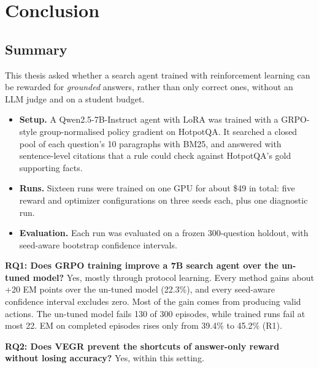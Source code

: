 \chapter{Conclusion}\label{sec:5}

\section{Summary}\label{sec:5.1}

This thesis asked whether a search agent trained with reinforcement
learning can be rewarded for \emph{grounded} answers, rather than only
correct ones, without an LLM judge and on a student budget.

\begin{itemize}
\tightlist
\item
  \textbf{Setup.} A Qwen2.5-7B-Instruct agent with LoRA was trained with
  a GRPO-style group-normalised policy gradient on HotpotQA. It searched
  a closed pool of each question's 10 paragraphs with BM25, and answered
  with sentence-level citations that a rule could check against
  HotpotQA's gold supporting facts.
\item
  \textbf{Runs.} Sixteen runs were trained on one GPU for about \$49 in
  total: five reward and optimizer configurations on three seeds each,
  plus one diagnostic run.
\item
  \textbf{Evaluation.} Each run was evaluated on a frozen 300-question
  holdout, with seed-aware bootstrap confidence intervals.
\end{itemize}

\textbf{RQ1: Does GRPO training improve a 7B search agent over the
un-tuned model?} Yes, mostly through protocol learning. Every method
gains about +20 EM points over the un-tuned model (22.3\%), and every
seed-aware confidence interval excludes zero. Most of the gain comes
from producing valid actions. The un-tuned model fails 130 of 300
episodes, while trained runs fail at most 22. EM on completed episodes
rises only from 39.4\% to 45.2\% (R1).

\textbf{RQ2: Does VEGR prevent the shortcuts of answer-only reward
without losing accuracy?} Yes, within this setting.

